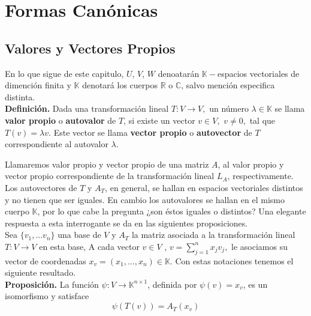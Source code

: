 \documentclass[10pt,a4paper]{article}
\begin{document}
\section{Formas Canónicas}
\subsection{Valores y Vectores Propios }
En lo que sigue de este capitulo, $U$, $V$, $W$ denoatarán $\mathbb{K}-$espacios vectoriales de dimención finita y $\mathbb{K}$ denotará los cuerpos $\mathbb{R}$ o $\mathbb{C}$, salvo mención especifica distinta.\\
\textbf{Definición.} Dada una transformación lineal $T : V \rightarrow{V},$ un número $\lambda \in \mathbb{K}$ se llama \textbf{valor propio} o \textbf{autovalor} de $T$, si existe un vector $v \in V,$ $v \neq 0,$ tal que $T(v) = \lambda v.$ Este vector se llama \textbf{vector propio} o \textbf{autovector} de $T$ correspondiente al autovalor $\lambda$.

Llamaremos valor propio y vector propio de una matriz $A$, al valor propio y vector propio correspondiente de la transformación lineal $L_{A}$, respectivamente. \\
Los autovectores de $T$ y $A_{T}$, en general, se hallan en espacios vectoriales distintos y no tienen que ser iguales. En cambio los autovalores se hallan en el mismo cuerpo $\mathbb{K}$, por lo que cabe la pregunta ¿son éstos iguales o distintos? Una elegante respuesta a esta interrogante se da en las siguientes proposiciones.\\

Sea $\{v_{1},...v_{n}\}$ una base de $V$ y $A_{T}$ la matriz asociada a la transformación lineal $T: V \rightarrow{V}$ en esta base, A cada vector $v \in V$ , $v = \displaystyle\sum_{j=1}^{n}x_{j}v_{j},$ le asociamos su vector de coordenadas $x_{v} = (x_{1},...,x_{n}) \in \mathbb{K}$. Con estas notaciones tenemos el siguiente resultado.\\

\textbf{Proposición.} La función $\psi : V \rightarrow \mathbb{K}^{n \times 1}$, definida por $\psi(v) = x_{v}$, es un isomorfismo y satisface 
$$\psi(T(v)) = A_{T}(x_{v})$$
\end{document}
